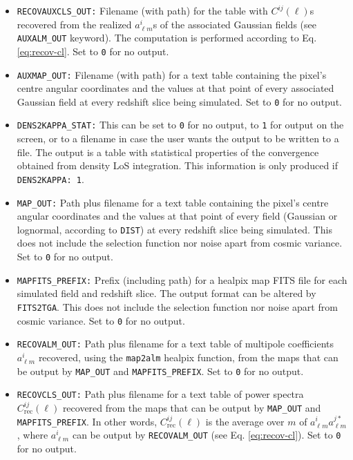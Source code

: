 \documentclass[12pt]{book} %
\newcommand{\nv}[1]{\mathrm{#1}}                 %
\begin{document}
\begin{itemize}
\item {\tt RECOVAUXCLS\_OUT:} Filename (with path) for the table with $C^{ij}(\ell)$s recovered 
  from the realized $a^{i}_{\ell m}$s of the associated Gaussian fields (see {\tt AUXALM\_OUT} keyword). 
  The computation is performed according to Eq. \ref{eq:recov-cl}. Set to {\tt 0} for no output.

\item {\tt AUXMAP\_OUT:} Filename (with path) for a text table containing the pixel's centre angular 
  coordinates and the values at that point of every associated Gaussian field at every redshift slice 
  being simulated. Set to {\tt 0} for no output.

\item {\tt DENS2KAPPA\_STAT:} This can be set to {\tt 0} for no output, to {\tt 1} for output 
  on the screen, or to a filename in case the user wants the output to be written to a file. 
  The output is a table with statistical properties of the convergence obtained from density 
  LoS integration. This information is only produced if {\tt DENS2KAPPA: 1}.

\item {\tt MAP\_OUT:} Path plus filename for a text table containing the pixel's centre angular 
  coordinates and the values at that point of every field (Gaussian or lognormal, according to 
  {\tt DIST}) at every redshift slice being simulated. This does not include the selection function 
  nor noise apart from cosmic variance. Set to {\tt 0} for no output. 

\item {\tt MAPFITS\_PREFIX:} Prefix (including path) for a {\sc healpix} map FITS file for each 
  simulated field and redshift slice. The output format can be altered by {\tt FITS2TGA}. This does not include 
  the selection function nor noise apart from cosmic variance. Set to {\tt 0} for no output. 
  
\item {\tt RECOVALM\_OUT:} Path plus filename for a text table of multipole coefficients 
  $a^{i}_{\ell m}$ recovered, using the {\tt map2alm} {\sc healpix} function, 
  from the maps that can be output by {\tt MAP\_OUT} and 
  {\tt MAPFITS\_PREFIX}. Set to {\tt 0} for no output. 

\item {\tt RECOVCLS\_OUT:} Path plus filename for a text table of power spectra 
  $C_{\nv{rec}}^{ij}(\ell)$ recovered from the maps that can be output by {\tt MAP\_OUT} and 
  {\tt MAPFITS\_PREFIX}. In other words, $C_{\nv{rec}}^{ij}(\ell)$ is the average over $m$ 
  of $a^{i}_{\ell m}a^{j*}_{\ell m}$, where $a^{i}_{\ell m}$ can be output by {\tt RECOVALM\_OUT} (see Eq. \ref{eq:recov-cl}). 
  Set to {\tt 0} for no output. 


\end{itemize}
\end{document}
